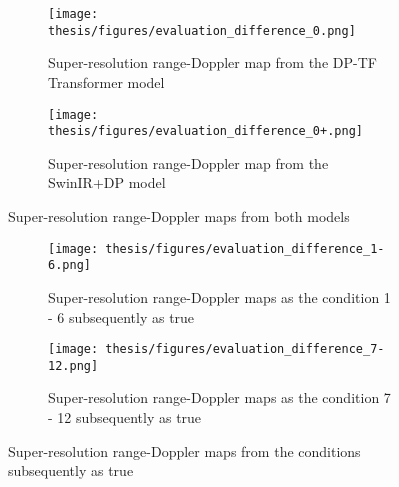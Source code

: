 \begin{figure}[t]
    \centering
    \begin{subfigure}{0.95\textwidth}
        \centering
        \texttt{[image: thesis/figures/evaluation\_difference\_0.png]}
        \caption{Super-resolution range-Doppler map from the DP-TF Transformer model}
        \label{Super-resolution image from the DP-TF Transformer model}
    \end{subfigure}
    \vspace{0.3cm}
    \begin{subfigure}{0.95\textwidth}
        \centering
        \texttt{[image: thesis/figures/evaluation\_difference\_0+.png]}
        \caption{Super-resolution range-Doppler map from the SwinIR+DP model}
        \label{Super-resolution image from the SwinIR+DP model}
    \end{subfigure}
    \caption{Super-resolution range-Doppler maps from both models}
    \label{Super-resolution images from the DP-TF Transformer and SwinIR+DP models}
\end{figure}

\begin{figure}[t]
    \centering
    \begin{subfigure}{0.95\textwidth}
        \centering
        \texttt{[image: thesis/figures/evaluation\_difference\_1-6.png]}
        \caption{Super-resolution range-Doppler maps as the condition 1 - 6 subsequently as true}
        \label{Super-resolution images from the condition 1 to condition 6 subsequently as true}
    \end{subfigure}
    \vspace{0.3cm}
    \begin{subfigure}{0.95\textwidth}
        \centering
        \texttt{[image: thesis/figures/evaluation\_difference\_7-12.png]}
        \caption{Super-resolution range-Doppler maps as the condition 7 - 12 subsequently as true}
        \label{Super-resolution images from the SwinIR+DP model}
    \end{subfigure}
    \caption{Super-resolution range-Doppler maps from the conditions subsequently as true}
    \label{Super-resolution images from the conditions subsequently as true}
\end{figure}